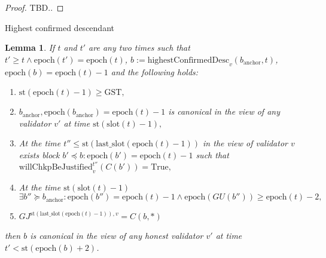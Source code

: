 \documentclass{article}
\newtheorem{lemma}{Lemma}
\begin{document}
\begin{proof}
    TBD..
\end{proof}


\begin{algorithm}[H]
\caption{Highest confirmed descendant}
\SetAlgoNoLine
{}
\end{algorithm}

\begin{lemma}
If $t$ and $t'$ are any two times such that $t' \geq t \wedge \text{epoch}(t') = \text{epoch}(t)$, $b := \text{highestConfirmedDesc}_v(b_{\text{anchor}}, t)$, $\text{epoch}(b) = \text{epoch}(t) - 1$ and the following holds:

\begin{enumerate}
    \item $\text{st}(\text{epoch}(t) - 1) \geq \text{GST},$
    \item $b_{\text{anchor}}, \text{epoch}(b_{\text{anchor}}) = \text{epoch}(t) - 1$ is canonical in the view of any validator $v'$ at time $\text{st}(\text{slot}(t) - 1),$
    \item At the time $t'' \leq \text{st}(\text{last\_slot}(\text{epoch}(t) - 1))$ in the view of validator $v$ exists block $b' \preceq b : \text{epoch}(b') = \text{epoch}(t) - 1$ such that $\text{willChkpBeJustified}^{t''}_v(C(b')) = \text{True},$
    \item At the time $\text{st}(\text{slot}(t) - 1)$ $\exists b'' \succeq b_{\text{anchor}} : \text{epoch}(b'') = \text{epoch}(t) - 1 \wedge \text{epoch}(GU(b'')) \geq \text{epoch}(t) - 2,$
    \item $GJ^{\text{st}(\text{last\_slot}(\text{epoch}(t) - 1)),v} = C(b, *)$
\end{enumerate}

then $b$ is canonical in the view of any honest validator $v'$ at time $t' < \text{st}(\text{epoch}(b) + 2)$.
\end{lemma}
\end{document}
